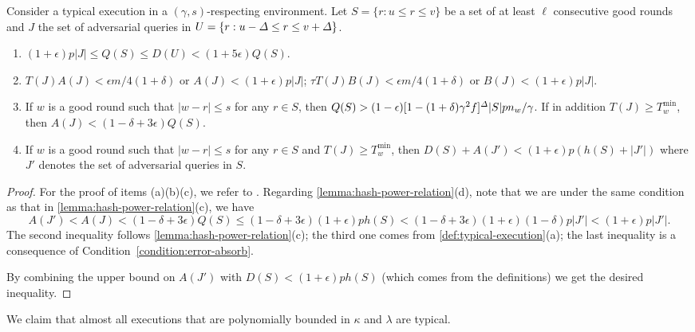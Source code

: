 \begin{lemma} \label{lemma:hash-power-relation}
    Consider a typical execution in a $(\gamma, s)$-respecting environment.
    Let $S = \{r : u \le r \le v \}$ be a set of at least $\ell$ consecutive good rounds and $J$ the set of adversarial queries in $U = \{ r : u - \varDelta \le r \le v + \varDelta\}$.
    \begin{enumerate}[label=(\alph*), leftmargin=*, nosep]
        \item $(1 + \epsilon) p|J| \le Q(S) \le D(U) < (1 + 5\epsilon) Q(S)$.

        \item $T(J) A(J) < \epsilon m/4(1 + \delta)$ or $A(J) < (1 + \epsilon)p|J|$; $\tau T(J) B(J) < \epsilon m/4(1 + \delta)$ or $B(J) < (1 + \epsilon) p|J|$.

        \item If $w$ is a good round such that $|w - r| \le s$ for any $r \in S$, then $Q(S) > (1 - \epsilon)[1 - (1 + \delta) \gamma^2 f]^\varDelta |S| p n_w / \gamma$. If in addition $T(J) \ge T^{\min}_w$, then $A(J) < (1 - \delta + 3\epsilon) Q(S)$.

        \item If $w$ is a good round such that $|w - r| \le s$ for any $r \in S$ and $T(J) \ge T^{\min}_w$, then $D(S) + A(J') < (1 + \epsilon) p(h(S) + |J'|)$ where $J'$ denotes the set of adversarial queries in $S$.
    \end{enumerate}
\end{lemma}

\begin{proof}
    For the proof of items (a)(b)(c), we refer to \cite{EPRINT:GarKiaLeo20}.
    Regarding \cref{lemma:hash-power-relation}(d), note that we are under the same condition as that in \cref{lemma:hash-power-relation}(c), we have
    \[ A(J') < A(J) < (1 - \delta + 3\epsilon) Q(S) \le (1 - \delta + 3\epsilon) (1 + \epsilon) p h(S) < (1 - \delta + 3\epsilon) (1 + \epsilon) (1 - \delta) p |J'| < (1 + \epsilon) p |J'|. \]
    The second inequality follows \cref{lemma:hash-power-relation}(c); the third one comes from \cref{def:typical-execution}(a); the last inequality is a consequence of Condition~\eqref{condition:error-absorb}.

    By combining the upper bound on $A(J')$ with $D(S) < (1 + \epsilon) p h(S)$ (which comes from the definitions) we get the desired inequality.
\end{proof}

We claim that almost all executions that are polynomially bounded in $\kappa$ and $\lambda$ are typical.

